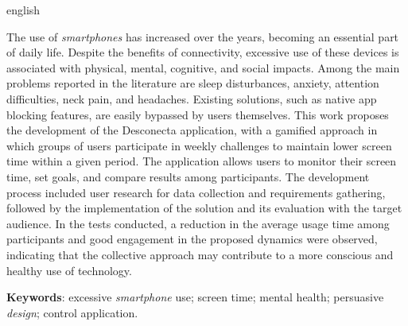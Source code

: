 \begin{resumo}[Abstract]
\begin{otherlanguage*}{english}
\begin{SingleSpace}
The use of \textit{smartphones} has increased over the years, becoming an essential part of daily life. Despite the benefits of connectivity, excessive use of these devices is associated with physical, mental, cognitive, and social impacts. Among the main problems reported in the literature are sleep disturbances, anxiety, attention difficulties, neck pain, and headaches. Existing solutions, such as native app blocking features, are easily bypassed by users themselves. This work proposes the development of the Desconecta application, with a gamified approach in which groups of users participate in weekly challenges to maintain lower screen time within a given period. The application allows users to monitor their screen time, set goals, and compare results among participants. The development process included user research for data collection and requirements gathering, followed by the implementation of the solution and its evaluation with the target audience. In the tests conducted, a reduction in the average usage time among participants and good engagement in the proposed dynamics were observed, indicating that the collective approach may contribute to a more conscious and healthy use of technology.
\end{SingleSpace}


\vspace{\onelineskip}
   \textbf{Keywords}: excessive \textit{smartphone} use; screen time; mental health; persuasive \textit{design}; control application.
 \end{otherlanguage*}
\end{resumo}